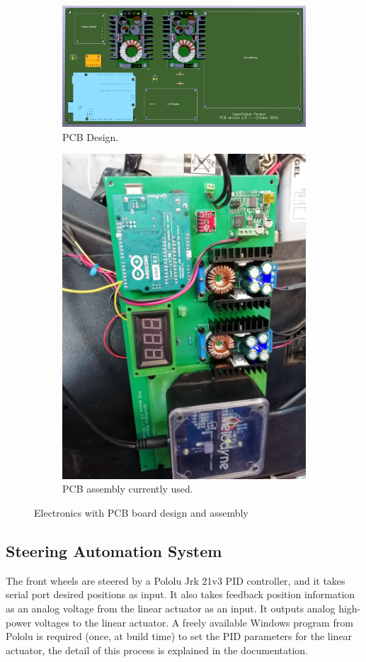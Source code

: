 \documentclass[a4paper]{article}
\begin{document}
	\begin{figure}
		\centering
		\begin{subfigure}{0.45\textwidth}
			\centering
			\includegraphics[width=\columnwidth]{hardware/pcb_version_1_5_pic1.png}
			\caption{PCB Design.}
			\label{fig:pcb_design}		
		\end{subfigure}
		\quad
		\begin{subfigure}{0.45\textwidth}
			\centering
			\includegraphics[width=0.5\columnwidth, angle=90]{hardware/pcb_podcar.jpg}
			\caption{PCB assembly currently used.}
			\label{fig:pcb_assembled}
		\end{subfigure}	
		\caption{Electronics with PCB board design and assembly}
	\end{figure}
	
	
	\subsection{Steering Automation System}
	
	The front wheels are steered by a Pololu Jrk 21v3 PID controller, and it takes serial port desired positions as input. It also takes feedback position information as an analog voltage from the linear actuator as an input. It outputs analog high-power voltages to the linear actuator. A freely available Windows program from Pololu is required (once, at build time) to set the PID parameters for the linear actuator, the detail of this process is explained in the documentation. 
	
\end{document}
